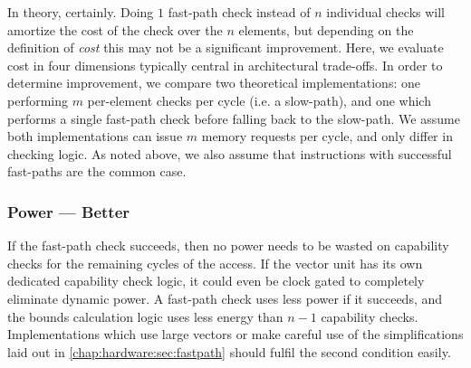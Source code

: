 

In theory, certainly.
Doing $1$ fast-path check instead of $n$ individual checks will amortize the cost of the check over the $n$ elements, but depending on the definition of \emph{cost} this may not be a significant improvement.
Here, we evaluate cost in four dimensions typically central in architectural trade-offs.
In order to determine improvement, we compare two theoretical implementations: one performing $m$ per-element checks per cycle (i.e. a slow-path), and one which performs a single fast-path check before falling back to the slow-path.
We assume both implementations can issue $m$ memory requests per cycle, and only differ in checking logic.
As noted above, we also assume that instructions with successful fast-paths are the common case.


\subsubsection*{Power --- Better}
If the fast-path check succeeds, then no power needs to be wasted on capability checks for the remaining cycles of the access.
If the vector unit has its own dedicated capability check logic, it could even be clock gated to completely eliminate dynamic power.
A fast-path check uses less power if it succeeds, and the bounds calculation logic uses less energy than $n - 1$ capability checks.
Implementations which use large vectors or make careful use of the simplifications laid out in \cref{chap:hardware:sec:fastpath} should fulfil the second condition easily.

